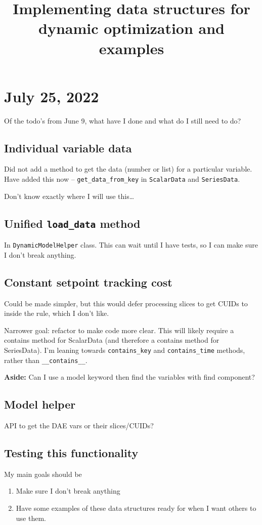 \documentclass{article}
\title{Implementing data structures for dynamic optimization and examples}
\begin{document}
\maketitle

\section{July 25, 2022}
Of the todo's from June 9, what have I done and what do I still need to do?

\subsection{Individual variable data}
Did not add a method to get the data (number or list) for a particular
variable. Have added this now -- \texttt{get\_data\_from\_key}
in \texttt{ScalarData} and \texttt{SeriesData}.

Don't know exactly where I will use this\ldots

\subsection{Unified \texttt{load\_data} method}
In \texttt{DynamicModelHelper} class. This can wait until I have tests,
so I can make sure I don't break anything.

\subsection{Constant setpoint tracking cost}
Could be made simpler, but this would defer processing slices to
get CUIDs to inside the rule, which I don't like.

Narrower goal: refactor to make code more clear.
This will likely require a contains method for ScalarData
(and therefore a contains method for SeriesData).
I'm leaning towards \texttt{contains\_key}
and \texttt{contains\_time} methods, rather than
\texttt{\_\_contains\_\_}.

\medskip

{\bf Aside:} Can I use a model keyword then find the variables
with find component?

\subsection{Model helper}
API to get the DAE vars or their slices/CUIDs?

\subsection{Testing this functionality}
My main goals should be
\begin{enumerate}
  \item Make sure I don't break anything
  \item Have some examples of these data structures ready for when I want
    others to use them.
\end{enumerate}
\end{document}
